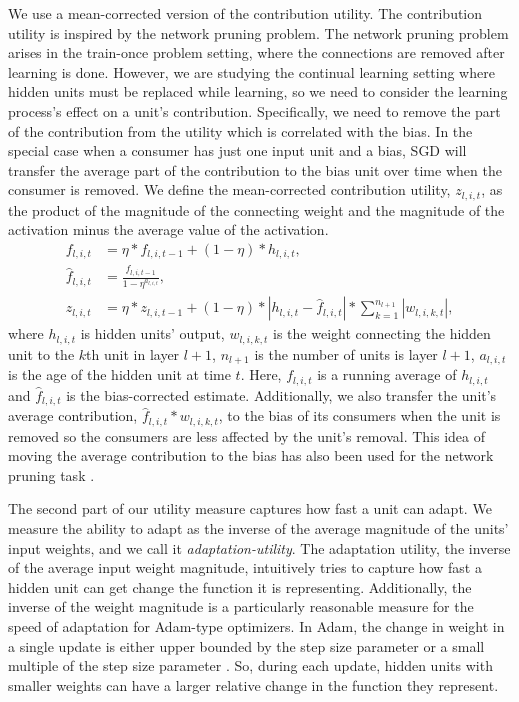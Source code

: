 \documentclass[review, number,3p]{elsarticle}
\begin{document}
We use a mean-corrected version of the contribution utility.
The contribution utility is inspired by the network pruning problem.
The network pruning problem arises in the train-once problem setting, where the connections are removed after learning is done. 
However, we are studying the continual learning setting where hidden units must be replaced while learning, so we need to consider the learning process's effect on a unit's contribution.
Specifically, we need to remove the part of the contribution from the utility which is correlated with the bias.
In the special case when a consumer has just one input unit and a bias, SGD will transfer the average part of the contribution to the bias unit over time when the consumer is removed.
We define the mean-corrected contribution utility, $z_{l, i, t}$, as the product of the magnitude of the connecting weight and the magnitude of the activation minus the average value of the activation.
\begin{align}
\label{eq:centered-util}
 f_{l, i, t} &= \eta*f_{l, i, t-1} + (1 - \eta)* h_{l, i, t}, \\
\hat{f}_{l, i, t} &= \frac{f_{l, i, t-1}}{1 - \eta^{a_{l, i, t}}}, \\
 z_{l, i, t} &= \eta*z_{l, i, t-1} + (1 - \eta)* |h_{l, i, t} - \hat{f}_{l, i, t}| *\sum_{k=1}^{n_{l+1}} |w_{l, i, k, t}|,
\end{align}
where $h_{l, i, t}$ is hidden units' output, $w_{l, i, k, t}$ is the weight connecting the hidden unit to the $k$th unit in layer $l+1$, $n_{l+1}$ is the number of units is layer $l+1$, $a_{l, i, t}$ is the age of the hidden unit at time $t$. Here, $f_{l, i, t}$ is a running average of $h_{l, i, t}$ and $\hat{f}_{l, i, t}$ is the bias-corrected estimate. 
Additionally, we also transfer the unit’s average contribution, $\hat{f}_{l, i, t} * w_{l, i, k, t}$, to the bias of its consumers when the unit is removed so the consumers are less affected by the unit’s removal.
This idea of moving the average contribution to the bias has also been used for the network pruning task \cite{bias-correction}.

The second part of our utility measure captures how fast a unit can adapt.
We measure the ability to adapt as the inverse of the average magnitude of the units' input weights, and we call it \textit{adaptation-utility}.
The adaptation utility, the inverse of the average input weight magnitude, intuitively tries to capture how fast a hidden unit can get change the function it is representing.
Additionally, the inverse of the weight magnitude is a particularly reasonable measure for the speed of adaptation for Adam-type optimizers. 
In Adam, the change in weight in a single update is either upper bounded by the step size parameter or a small multiple of the step size parameter \cite{kingma2015}. 
So, during each update, hidden units with smaller weights can have a larger relative change in the function they represent.
\end{document}
